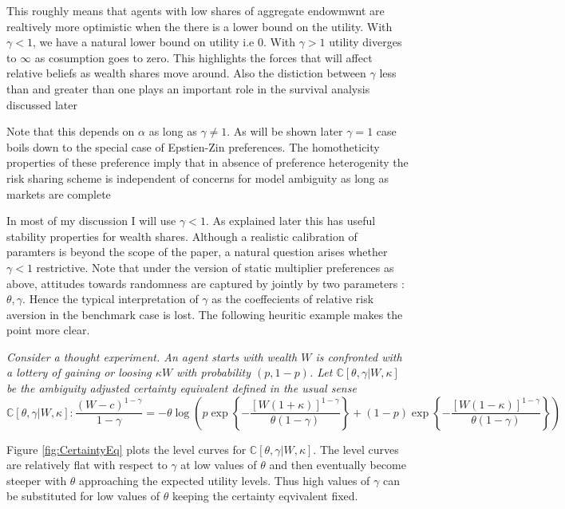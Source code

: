 \documentclass[12pt]{article}
\begin{document}
\noindent  This roughly means that agents with low shares of aggregate endowmwnt are realtively more optimistic when the there is a lower bound on the utility. With $\gamma < 1$, we have a natural lower bound on utility i.e 0. With $\gamma > 1$ utility diverges to $\infty$ as cosumption goes to zero. This highlights the forces that will affect relative beliefs as wealth shares move around. Also the distiction between $\gamma$ less than and greater than one plays an important role in the survival analysis discussed later


Note that this depends on $\alpha$ as long as $\gamma\neq 1$. As will be shown later $\gamma=1$ case boils down to the special case of Epstien-Zin preferences. The homotheticity properties of these preference imply that in absence of preference heterogenity the risk sharing scheme is independent of concerns for model ambiguity as long as markets are complete



\noindent In most of my discussion I will use $\gamma < 1$. As explained later this has useful stability properties for wealth shares. Although a realistic calibration of paramters is beyond the scope of the paper, a natural question arises whether $\gamma < 1$ restrictive. Note that under the version of static multiplier preferences as above, attitudes towards randomness are captured by jointly by two parameters : $\theta, \gamma$. Hence the typical interpretation of $\gamma$ as the coeffecients of relative risk aversion in the benchmark case is lost. The following heuritic example makes the point more clear. 

\noindent \emph{Consider a thought experiment. An agent starts with wealth $W$ is confronted with a lottery of gaining or loosing $\kappa W$ with probability $(p,1-p)$. Let $\mathbb{C}[\theta,\gamma|W,\kappa]$ be the ambiguity adjusted certainty equivalent defined in the usual sense}
\[
\mathbb{C}[\theta,\gamma|W,\kappa] : \frac { (W-c)^{1-\gamma} } {1-\gamma}=
-\theta \log
\left(
p \exp\left \{-\frac {[W(1+\kappa)]^{1-\gamma}}  {\theta (1-\gamma)} \right \}
+(1-p)\exp \left \{-\frac {[W(1-\kappa)]^{1-\gamma}} {\theta (1-\gamma)} \right\} \right)\]

\noindent Figure \ref{fig:CertaintyEq} plots the level curves for $\mathbb{C}[\theta,\gamma|W,\kappa]$. The level curves are relatively flat with respect to $\gamma$ at low values of $\theta$ and then eventually become steeper with $\theta$ approaching the expected utility levels. Thus  high values of $\gamma$ can be substituted for low values of $\theta$ keeping the certainty eqvivalent fixed. 
\end{document}

